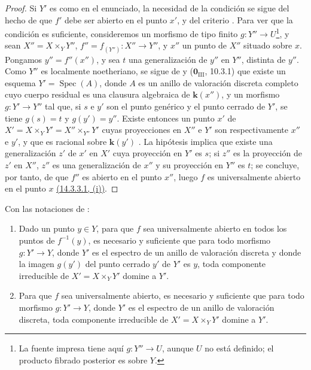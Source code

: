 \begin{proof}
Si $Y'$ es como en el enunciado, la necesidad de la condición se sigue del hecho de que $f'$ debe ser abierto en el punto $x'$, y del criterio .
Para ver que la condición es suficiente, consideremos un morfismo de tipo finito $g:Y''\to U$\footnote{La fuente impresa tiene aquí $g:Y''\to U$, aunque $U$ no está definido; el producto fibrado posterior es sobre $Y$.}, y sean $X''=X\times_Y Y''$, $f''=f_{(Y'')}:X''\to Y''$, y $x''$ un punto de $X''$ situado sobre $x$.
Pongamos $y''=f''(x'')$, y sea $t$ una generalización de $y''$ en $Y''$, distinta de $y''$.
Como $Y''$ es localmente noetheriano, se sigue de  y ($\mathbf{0}_{\mathrm{III}}$, 10.3.1) que existe un esquema $Y'=\operatorname{Spec}(A)$, donde $A$ es un anillo de valoración discreta completo cuyo cuerpo residual es una clausura algebraica de $\boldsymbol{k}(x'')$, y un morfismo $g:Y'\to Y''$ tal que, si $s$ e $y'$ son el punto genérico y el punto cerrado de $Y'$, se tiene $g(s)=t$ y $g(y')=y''$.
Existe entonces un punto $x'$ de $X'=X\times_Y Y'=X''\times_{Y''}Y'$ cuyas proyecciones en $X''$ e $Y'$ son respectivamente $x''$ e $y'$, y que es racional sobre $\boldsymbol{k}(y')$ .
La hipótesis implica que existe una generalización $z'$ de $x'$ en $X'$ cuya proyección en $Y'$ es $s$; si $z''$ es la proyección de $z'$ en $X''$, $z''$ es una generalización de $x''$ y su proyección en $Y''$ es $t$; se concluye, por tanto, de  que $f''$ es abierto en el punto $x''$, luego $f$ es universalmente abierto en el punto $x$ {\hyperlink{ega4.c04.subsec.14-3-3-1}{(14.3.3.1, (i))}}.
\end{proof}

\begin{corollary}[14.3.7]
\label{IV.14.3.7}
Con las notaciones de :
\begin{enumerate}[label=\textup{(\roman*)}]
  \item Dado un punto $y\in Y$, para que $f$ sea universalmente abierto en todos los puntos de $f^{-1}(y)$, es necesario y suficiente que para todo morfismo $g:Y'\to Y$, donde $Y'$ es el espectro de un anillo de valoración discreta y donde la imagen $g(y')$ del punto cerrado $y'$ de $Y'$ es $y$, toda componente irreducible de $X'=X\times_Y Y'$ domine a $Y'$.
  \item Para que $f$ sea universalmente abierto, es necesario y suficiente que para todo morfismo $g:Y'\to Y$, donde $Y'$ es el espectro de un anillo de valoración discreta, toda componente irreducible de $X'=X\times_Y Y'$ domine a $Y'$.
\end{enumerate}
\end{corollary}

